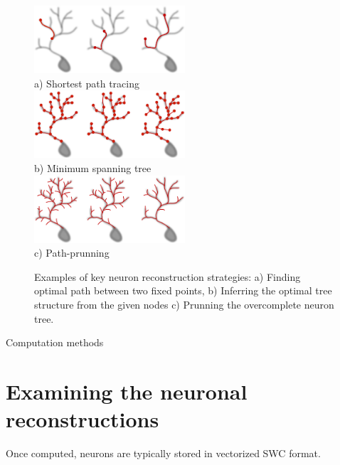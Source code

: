 \begin{figure}
\begin{center}
\includegraphics[width=0.5\textwidth]{ch1_fig2}\\
a) Shortest path tracing \\
\includegraphics[width=0.5\textwidth]{ch1_fig3}\\
b) Minimum spanning tree \\
\includegraphics[width=0.5\textwidth]{ch1_fig4}\\
c) Path-prunning
\end{center}
\vspace{-3ex}
\caption{Examples of key neuron reconstruction strategies: a) Finding optimal path between two fixed points, b) Inferring the  optimal tree structure from the given nodes c) Prunning the overcomplete neuron tree.}
\vspace{-1ex}
\label{ch1__fig2-4}
\end{figure}

Computation methods

\section{Examining the neuronal reconstructions}
Once computed, neurons are typically stored in vectorized SWC format. 
